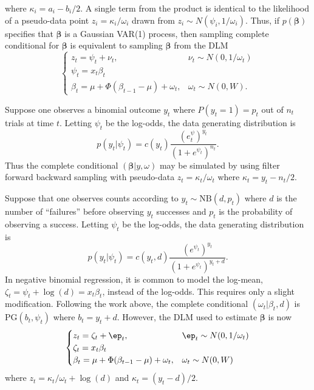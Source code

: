 \documentclass[11pt]{article}
\newcommand{\PG}{\text{PG}}
\newcommand{\NB}{\text{NB}}
\newcommand{\bbeta}{\boldsymbol{\beta}}
\begin{document}
where $\kappa_i = a_i - b_i / 2$.  A single term from the product is identical
to the likelihood of a pseudo-data point $z_i = \kappa_i / \omega_i$ drawn from
$z_i \sim N(\psi_i, 1/\omega_i)$.  Thus, if $p(\bbeta)$ specifies that $\bbeta$
is a Gaussian VAR(1) process, then sampling complete conditional for $\bbeta$ is
equivalent to sampling $\bbeta$ from the DLM
\[
\begin{cases}
z_t = \psi_t + \nu_t, & \nu_t \sim N(0, 1/\omega_t) \\
\psi_t = x_t \beta_t \\
\beta_t = \mu + \Phi (\beta_{t-1} - \mu) + \omega_t, & \omega_t \sim N(0, W).
\end{cases}
\]

\begin{example}
Suppose one observes a binomial outcome $y_t$ where $P(y_t = 1) = p_t$ out of
$n_t$ trials at time $t$.  Letting $\psi_t$ be the log-odds, the data generating
distribution is
\[
p(y_t | \psi_t) = c(y_t) \frac{(e^\psi_t)^{y_t}}{(1+e^{\psi_t})^{n_t}}.
\]
Thus the complete conditional $(\bbeta | y, \omega)$ may be simulated by using
filter forward backward sampling with pseudo-data $z_t = \kappa_t / \omega_t$
where $\kappa_t = y_t - n_t / 2$.
\end{example}


\begin{example}
Suppose that one observes counts according to $y_t \sim \NB(d, p_t)$ where $d$
is the number of ``failures'' before observing $y_t$ successes and $p_t$ is the
probability of observing a success.  Letting $\psi_t$ be the log-odds, the data
generating distribution is
\[
p(y_t | \psi_t) = c(y_t, d) \frac{(e^{\psi_t})^{y_t}}{(1+e^{\psi_t})^{y_t+d}}.
\]
In negative binomial regression, it is common to model the log-mean, $\zeta_t =
\psi_t + \log(d) = x_t \beta_t$, instead of the log-odds.  This requires only a
slight modification.  Following the work above, the complete conditional
$(\omega_t | \beta_t, d)$ is $\PG(b_t, \psi_t)$ where $b_t = y_t + d$.
However, the DLM used to estimate $\bbeta$ is now
\[
\begin{cases}
z_t = \zeta_t + \ep_t, & \ep_t \sim N(0, 1/\omega_t) \\
\zeta_t = x_t \beta_t \\
\beta_t = \mu + \Phi (\beta_{t-1} - \mu) + \omega_t, & \omega_t \sim N(0, W)
\end{cases}
\]
where $z_t = \kappa_t / \omega_t + \log(d)$ and $\kappa_t = (y_t - d) / 2$.
\end{example}
\end{document}
